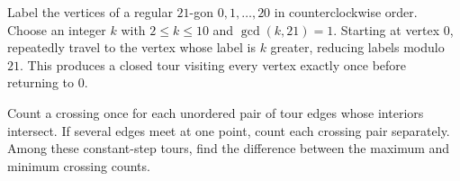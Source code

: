 Label the vertices of a regular $21$-gon $0,1,\ldots,20$ in counterclockwise order. Choose an integer $k$ with $2\le k\le10$ and $\gcd(k,21)=1$. Starting at vertex $0$, repeatedly travel to the vertex whose label is $k$ greater, reducing labels modulo $21$. This produces a closed tour visiting every vertex exactly once before returning to $0$.

Count a crossing once for each unordered pair of tour edges whose interiors intersect. If several edges meet at one point, count each crossing pair separately. Among these constant-step tours, find the difference between the maximum and minimum crossing counts.
